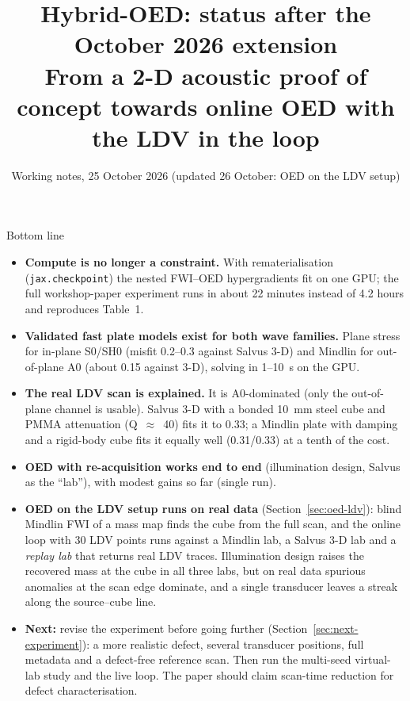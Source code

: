 \documentclass[11pt,a4paper]{article}
\title{\textbf{Hybrid-OED: status after the October 2026 extension}\\[4pt]
\large From a 2-D acoustic proof of concept towards online OED with the LDV in the loop}
\author{Working notes, 25 October 2026 (updated 26 October: OED on the LDV setup)}
\date{}
\newcommand{\code}[1]{\texttt{\footnotesize #1}}
\begin{document}
\maketitle

\begin{keybox}{Bottom line}
\begin{itemize}
  \item \textbf{Compute is no longer a constraint.} With rematerialisation (\code{jax.checkpoint}) the nested
        FWI--OED hypergradients fit on one GPU; the full workshop-paper experiment runs in about 22 minutes
        instead of 4.2 hours and reproduces Table~1.
  \item \textbf{Validated fast plate models exist for both wave families.} Plane stress for in-plane S0/SH0
        (misfit 0.2--0.3 against Salvus 3-D) and Mindlin for out-of-plane A0 (about 0.15 against 3-D), solving in
        1--10~s on the GPU.
  \item \textbf{The real LDV scan is explained.} It is A0-dominated (only the out-of-plane channel is usable).
        Salvus 3-D with a bonded 10~mm steel cube and PMMA attenuation (Q~$\approx$~40) fits it to 0.33; a
        Mindlin plate with damping and a rigid-body cube fits it equally well (0.31/0.33) at a tenth of the cost.
  \item \textbf{OED with re-acquisition works end to end} (illumination design, Salvus as the ``lab''), with
        modest gains so far (single run).
  \item \textbf{OED on the LDV setup runs on real data} (Section~\ref{sec:oed-ldv}): blind Mindlin FWI of a mass map
        finds the cube from the full scan, and the online loop with 30 LDV points runs against a Mindlin lab, a Salvus
        3-D lab and a \emph{replay lab} that returns real LDV traces. Illumination design raises the recovered mass
        at the cube in all three labs, but on real data spurious anomalies at the scan edge dominate, and a single
        transducer leaves a streak along the source--cube line.
  \item \textbf{Next:} revise the experiment before going further (Section~\ref{sec:next-experiment}): a more
        realistic defect, several transducer positions, full metadata and a defect-free reference scan. Then run the
        multi-seed virtual-lab study and the live loop. The paper should claim scan-time reduction for defect
        characterisation.
\end{itemize}
\end{keybox}
\end{document}
